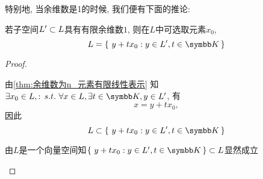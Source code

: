     特别地, 当余维数是1的时候, 我们便有下面的推论:
    \begin{corollary}
        若子空间$L^{\prime} \subset L$具有有限余维数$1$, 则在$L$中可选取元素$x_0$, \st 
        \[L= \set{y+tx_0}{y\in L\pie, t\in \K}\]
    \end{corollary}
    \begin{proof}
        \begin{step}
            \item 由\autoref{thm:余维数为n_元素有限线性表示} 知$\exists x_0 \in L, \st \forall x\in L, \exists t\in \K, y\in L\pie$, 有\[
                x=y+tx_0,\] 因此 \[L\zj \set{y+tx_0}{y\in L\pie, t\in \K}\]
            \item 由$L$是一个向量空间知$\set{y+tx_0}{y\in L\pie, t\in \K} \zj L$显然成立 \qedhere
        \end{step}
    \end{proof}